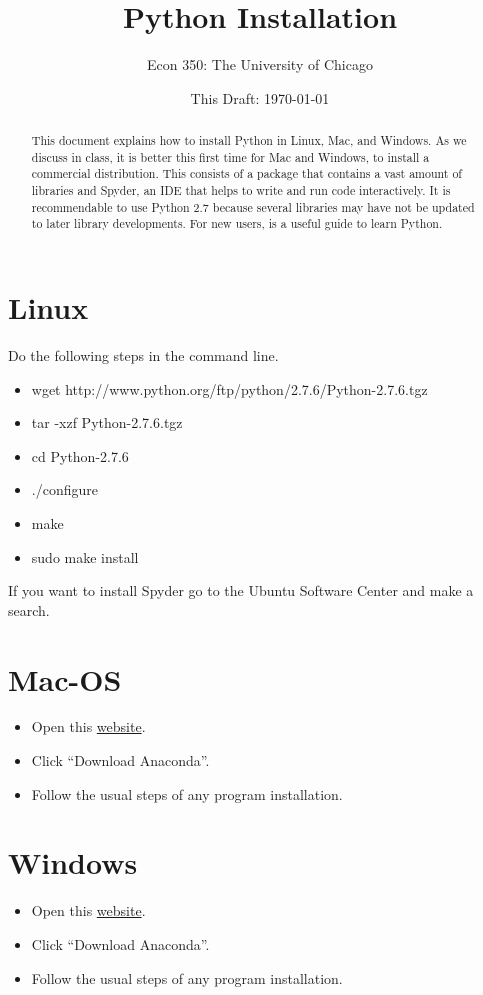 



\title{Python Installation}
\author{Econ 350: The University of Chicago}
\date{This Draft: \today}
\maketitle

\begin{abstract}
\noindent This document explains how to install Python in Linux, Mac, and Windows. As we discuss in class, it is better this first time for Mac and Windows, to install a commercial distribution. This consists of a package that contains a vast amount of libraries and Spyder, an IDE that helps to write and run code interactively. It is recommendable to use Python 2.7 because several libraries may have not be updated to later library developments. For new users, \citet{langtangen2011primer} is a useful guide to learn Python.
\end{abstract}

\section{Linux}
Do the following steps in the command line.
\begin{itemize}
\item wget http://www.python.org/ftp/python/2.7.6/Python-2.7.6.tgz
\item tar -xzf Python-2.7.6.tgz  
\item cd Python-2.7.6
\item ./configure
\item make
\item sudo make install
\end{itemize}
If you want to install Spyder go to the Ubuntu Software Center and make a search. 

\section{Mac-OS}
\begin{itemize}
\item Open this \href{https://store.continuum.io/cshop/anaconda/}{website}.
\item Click ``Download Anaconda''.
\item Follow the usual steps of any program installation.
\end{itemize}

\section{Windows}
\begin{itemize}
\item Open this \href{https://store.continuum.io/cshop/anaconda/}{website}.
\item Click ``Download Anaconda''.
\item Follow the usual steps of any program installation.
\end{itemize}




